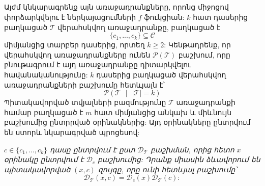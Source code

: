 \documentclass[12pt]{article}
\begin{document}
\begin{center}
\subsection*{
 } 
 \end{center}
 \noindent
{}
{}

\par Այժմ կնկարագրենք այն առաջադրանքները, որոնց միջոցով փորձարկվելու է ներկայացումների $f$ ֆուկցիան: $k$ հատ դասերից բաղկացած $\mathcal{T}$ վերահսկվող առաջադրանքը, բաղկացած է $$\{c_1, ..., c_{k}\} \subseteq \mathcal{C}$$
միմյանցից տարբեր դասերից, որտեղ $k \geq 2$: Կենթադրենք, որ վերահսկվող առաջադրանքները ունեն $\mathcal{P}(\mathcal{T})$ բաշխում, որը բնութագրում է այդ առաջադրանքը դիտարկվելու հավանականությունը: $k$ դասերից բաղկացած վերահսկվող առաջադրանքների բաշխումը հետևյալն է՝ $$\mathcal{P}(\mathcal{T} \text{ } |\text{ }  |\mathcal{T}| = k )$$ Պիտակավորված տվյալների բազմությունը $\mathcal{T}$ առաջադրանքի համար բաղկացած է $m$ հատ միմյանցից անկախ և միևնույն բաշխումից ընտրրված օրինակներից: Այդ օրինակները ընտրվում են ստորև նկարագրված պրոցեսով:

\textit{$c \in \{c_1, ..., c_{k}\} $   դասը ընտրվում է ըստ $\mathcal{D}_{\mathcal{T}}$ բաշխման, որից հետո $x$ օրինակը ընտրվում է $\mathcal{D}_c$ բաշխումից: Դրանք միասին ձևավորում են պիտակավորված $(x, c)$ զույգը, որը ունի հետևյալ բաշխումը՝
$$\mathcal{D}_{\mathcal{T}} (x, c) = \mathcal{D}_{c}(x)\mathcal{D}_{\mathcal{T}}(c):$$}

\begin{center}
\subsection*{
 } 
 \end{center}
 \noindent
{}
{}
\end{document}
